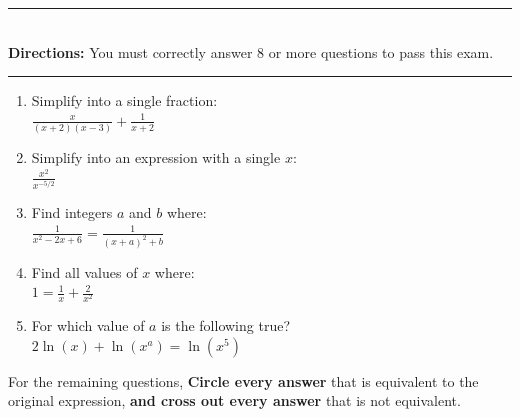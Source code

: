 \documentclass[12pt]{article}
\makeatletter
\def\saveenum{\xdef\@savedenum{\the\c@enumi\relax}}
\makeatother
\begin{document}
\hrule\ \\
{\small {\bf Directions:} You must correctly answer 8 or more questions to pass this exam.}

\hrule

\pagestyle{empty}

\begin{enumerate}
	\item Simplify into a single fraction: \,\\[.1 in]
	$\displaystyle \frac{x}{(x+2)(x-3)} + \frac{1}{x+2}$\\
	\- \hfill \underline{\hspace{2 in}} 
	\item Simplify into an expression with a single $x$:  \,\\[.1 in]
	$\frac{x^{2}}{x^{-5/2}}$\hfill \underline{\hspace{2 in}}
	\item Find integers $a$ and $b$ where:  \,\\[.1 in]
	$\displaystyle \frac{1}{x^2 - 2x  + 6} = \frac{1}{(x + a)^2 + b}$ \hfill \underline{\hspace{2 in}}
	\item Find all values of $x$ where:  \,\\[.1 in]
	$\displaystyle 1 = \frac{1}{x} + \frac{2}{x^2}$ \hfill \underline{\hspace{2 in}}
	\item For which value of $a$ is the following true? \,\\[.1 in]
	$\displaystyle 2\ln(x) + \ln(x^a) = \ln(x^5)$ \hfill \underline{\hspace{2 in}}
\end{enumerate}
\saveenum
For the remaining questions, {\bf Circle every answer} that is equivalent to the original expression, {\bf and cross out every answer} that is not equivalent.
\end{document}
